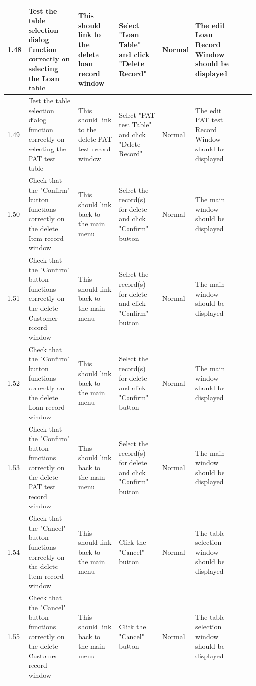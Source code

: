 \begin{landscape}
\begin{center}
\begin{longtable}{|p{1.5cm}|p{2cm}|p{3cm}|p{2cm}|p{2cm}|p{2.5cm}|p{2cm}|p{2cm}|}
        1.48 & Test the table selection dialog function correctly on selecting the Loan table & This should link to the delete loan record window & Select "Loan 
        Table" and click "Delete Record" & Normal & The edit Loan Record Window should be displayed & & \\ \hline
        
        1.49 & Test the table selection dialog function correctly on selecting the PAT test table & This should link to the delete PAT test record window & Select "PAT 
        test Table" and click "Delete Record" & Normal & The edit PAT test Record Window should be displayed & & \\ \hline
        
        1.50 & Check that the "Confirm" button functions correctly on the delete Item record window & This should link back to the main menu & Select the record(s) for 
        delete and click "Confirm" button & Normal & The main window should be displayed & & \\ \hline
        
        1.51 & Check that the "Confirm" button functions correctly on the delete Customer record window & This should link back to the main menu & Select the record(s) 
        for delete and click "Confirm" button & Normal & The main window should be displayed & & \\ \hline
        
        1.52 & Check that the "Confirm" button functions correctly on the delete Loan record window & This should link back to the main menu & Select the record(s) for 
        delete and click "Confirm" button & Normal & The main window should be displayed & & \\ \hline
        
        1.53 & Check that the "Confirm" button functions correctly on the delete PAT test record window & This should link back to the main menu & Select the record(s) 
        for delete and click "Confirm" button & Normal & The main window should be displayed & & \\ \hline
        
        1.54 & Check that the "Cancel" button functions correctly on the delete Item record window & This should link back to the main menu & Click the "Cancel" 
        button & Normal & The table selection window should be displayed & & \\ \hline
        
        1.55 & Check that the "Cancel" button functions correctly on the delete Customer record window & This should link back to the main menu & Click the "Cancel" 
        button & Normal & The table selection window should be displayed & & \\ \hline
        

\end{longtable}
\end{center}
\end{landscape}
